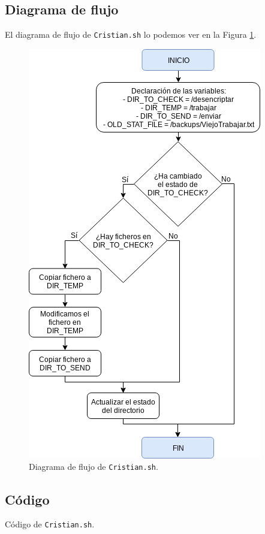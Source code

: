 \subsection{Diagrama de flujo}
El diagrama de flujo de \texttt{Cristian.sh} lo podemos ver en la Figura \ref{Diagrama de flujo de Cristian.sh}.
\begin{figure}[h]
	\centering
	\includegraphics[scale=0.7]{Anexos/Anexo3/Diagramas/Cristian.png}
	\caption{Diagrama de flujo de \texttt{Cristian.sh}.}
	\label{Diagrama de flujo de Cristian.sh}
\end{figure}

\newpage
\subsection{Código}

\begin{center}
	Código de \texttt{Cristian.sh}.
\end{center}

